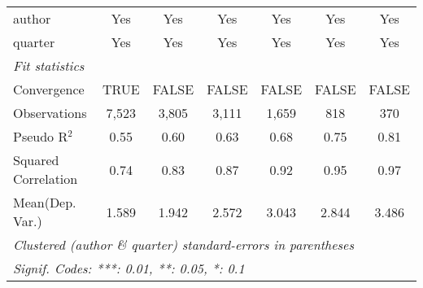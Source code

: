 \begin{tabular}{lcccccc}
   author                                                     & Yes            & Yes            & Yes          & Yes          & Yes           & Yes\\  
   quarter                                                    & Yes            & Yes            & Yes          & Yes          & Yes           & Yes\\  
   \midrule
   \emph{Fit statistics}\\
   Convergence                                                &TRUE            & FALSE          & FALSE        & FALSE        & FALSE         & FALSE\\  
   Observations                                               & 7,523          & 3,805          & 3,111        & 1,659        & 818           & 370\\  
   Pseudo R$^2$                                               & 0.55           & 0.60           & 0.63         & 0.68         & 0.75          & 0.81\\  
   Squared Correlation                                        & 0.74           & 0.83           & 0.87         & 0.92         & 0.95          & 0.97\\  
Mean(Dep. Var.) & 1.589 & 1.942 & 2.572 & 3.043 & 2.844 & 3.486 \\
   \midrule \midrule
   \multicolumn{7}{l}{\emph{Clustered (author \& quarter) standard-errors in parentheses}}\\
   \multicolumn{7}{l}{\emph{Signif. Codes: ***: 0.01, **: 0.05, *: 0.1}}\\
\end{tabular}
\par\endgroup

